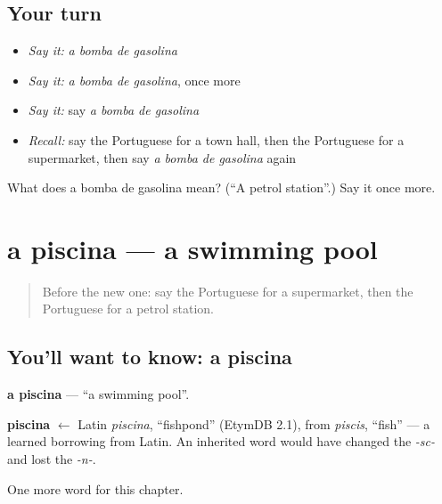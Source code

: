 \subsection*{Your turn}
\begin{itemize}
\raggedright
  \item \emph{Say it:} \emph{a bomba de gasolina}
  \item \emph{Say it:} \emph{a bomba de gasolina}, once more
  \item \emph{Say it:} say \emph{a bomba de gasolina}
  \item \emph{Recall:} say the Portuguese for a town hall, then the Portuguese for a supermarket, then say \emph{a bomba de gasolina} again
\end{itemize}

\begin{tcolorbox}[breakable,colback=teal!4,colframe=teal!35!black,title={Before you move on}]
What does a bomba de gasolina mean? (\textquotedblleft{}A petrol station\textquotedblright{}.) Say it once more.
\end{tcolorbox}
\section[a piscina]{a piscina — a swimming pool}

\label{lesson:PT-C86-piscina}



\begin{quote}
Before the new one: say the Portuguese for a supermarket, then the Portuguese for a petrol station.
\end{quote}

\subsection*{You'll want to know: a piscina}
\textbf{a piscina} — \textquotedblleft{}a swimming pool\textquotedblright{}.

\begin{cousinweb}
\textbf{piscina} $\leftarrow$ Latin \emph{piscina}, \textquotedblleft{}fishpond\textquotedblright{} (EtymDB 2.1), from \emph{piscis}, \textquotedblleft{}fish\textquotedblright{} — a learned borrowing from Latin. An inherited word would have changed the \emph{-sc-} and lost the \emph{-n-}.
\end{cousinweb}

\begin{grammarlens}[title={What you've built}]
One more word for this chapter.
\end{grammarlens}

